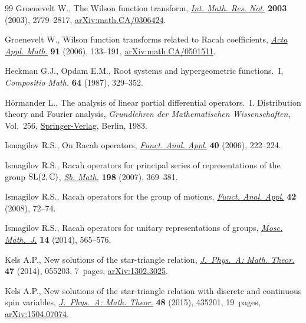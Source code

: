 \documentclass[pdftex]{sigma}
\numberwithin{equation}{section}
\begin{document}
\begin{thebibliography}{99}
Groenevelt W., The Wilson function transform, \href{https://doi.org/10.1155/S107379280313190X}{\textit{Int. Math. Res. Not.}}
 \textbf{2003} (2003), 2779--2817, \href{https://arxiv.org/abs/math.CA/0306424}{arXiv:math.CA/0306424}.

Groenevelt W., Wilson function transforms related to Racah coefficients,
 \href{https://doi.org/10.1007/s10440-006-9024-7}{\textit{Acta Appl. Math.}} \textbf{91} (2006), 133--191,
 \href{https://arxiv.org/abs/math.CA/0501511}{arXiv:math.CA/0501511}.

Heckman G.J., Opdam E.M., Root systems and hypergeometric functions.~{I},
 \textit{Compositio Math.} \textbf{64} (1987), 329--352.

H\"{o}rmander L., The analysis of linear partial differential operators.~{I}.
 Distribution theory and Fourier analysis, \textit{Grundlehren der
 Mathematischen Wissenschaften}, Vol.~256, \href{https://doi.org/10.1007/978-3-642-96750-4}{Springer-Verlag}, Berlin, 1983.

Ismagilov R.S., On {R}acah operators, \href{https://doi.org/10.1007/s10688-006-0034-z}{\textit{Funct. Anal. Appl.}} \textbf{40}
 (2006), 222--224.

Ismagilov R.S., Racah operators for principal series of representations of the
 group ${\rm SL}(2,{\mathbb C})$, \href{https://doi.org/10.1070/SM2007v198n03ABEH003840}{\textit{Sb. Math.}} \textbf{198} (2007),
 369--381.

Ismagilov R.S., Racah operators for the group of motions, \href{https://doi.org/10.1007/s10688-008-0009-3}{\textit{Funct. Anal.
 Appl.}} \textbf{42} (2008), 72--74.

Ismagilov R.S., Racah operators for unitary representations of groups,
 \href{https://doi.org/10.17323/1609-4514-2014-14-3-565-576}{\textit{Mosc. Math.~J.}} \textbf{14} (2014), 565--576.

Kels A.P., New solutions of the star-triangle relation, \href{https://doi.org/10.1088/1751-8113/47/5/055203}{\textit{J.~Phys.~A:
 Math. Theor.}} \textbf{47} (2014), 055203, 7~pages, \href{https://arxiv.org/abs/1302.3025}{arXiv:1302.3025}.

Kels A.P., New solutions of the star-triangle relation with discrete and
 continuous spin variables, \href{https://doi.org/10.1088/1751-8113/48/43/435201}{\textit{J.~Phys.~A: Math. Theor.}} \textbf{48}
 (2015), 435201, 19~pages, \href{https://arxiv.org/abs/1504.07074}{arXiv:1504.07074}.


\end{thebibliography}
\end{document}
